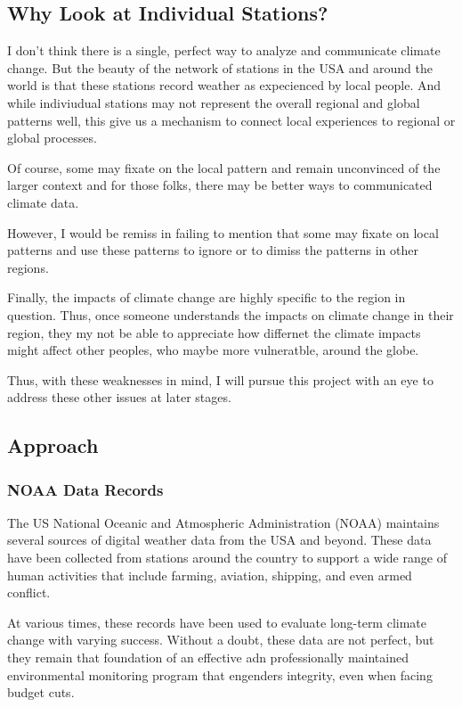 \documentclass{article}\usepackage[]{graphicx}\usepackage[]{xcolor}
\begin{document}
\subsection{Why Look at Individual Stations?}

I don't think there is a single, perfect way to analyze and communicate climate change. But the beauty of the network of stations in the USA and around the world is that these stations record weather as expecienced by local people. And while indiviudual stations may not represent the overall regional and global patterns well, this give us a mechanism to connect local experiences to regional or global processes. 

Of course, some may fixate on the local pattern and remain unconvinced of the larger context and for those folks, there may be better ways to communicated climate data. 

However, I would be remiss in failing to mention that some may fixate on local patterns and use these patterns to ignore or to dimiss the patterns in other regions. 

Finally, the impacts of climate change are highly specific to the region in question. Thus, once someone understands the impacts on climate change in their region, they my not be able to appreciate how differnet the climate impacts might affect other peoples, who maybe more vulneratble, around the globe. 

Thus, with these weaknesses in mind, I will pursue this project with an eye to address these other issues at later stages.

\subsection{Approach}

\subsubsection{NOAA Data Records}

The US National Oceanic and Atmospheric Administration (NOAA) maintains several sources of digital weather data from the USA and beyond. These data have been collected from stations around the country to support a wide range of human activities that include farming, aviation, shipping, and even armed conflict. 

At various times, these records have been used to evaluate long-term climate change with varying success. Without a doubt, these data are not perfect, but they remain that foundation of an effective adn professionally maintained environmental monitoring program that engenders integrity, even when facing budget cuts. 
\end{document}
